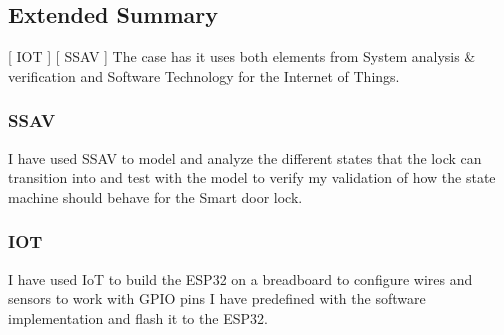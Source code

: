 \subsection*{Extended Summary}
[ IOT ] [ SSAV ] \newline
The case has it uses both elements from System analysis \& verification and Software Technology for the Internet of Things.
\subsubsection{\textbf{SSAV}}
I have used SSAV to model and analyze the different states that the lock can transition into and test with the model to verify my validation of how the state machine should behave for the Smart door lock.
\subsubsection{\textbf{IOT}}
I have used IoT to build the ESP32 on a breadboard to configure wires and sensors to work with GPIO pins I have predefined with the software implementation and flash it to the ESP32. 